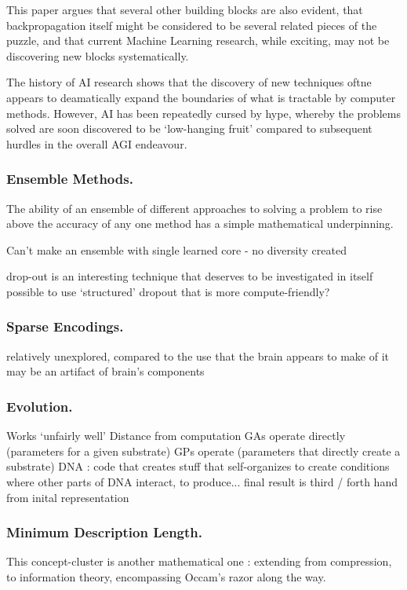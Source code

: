 \documentclass[citeauthoryear]{llncs}
\begin{document}
This paper argues that several other building blocks are also evident, 
that backpropagation itself might be considered to be several related pieces of the puzzle,
and that current Machine Learning research, while exciting, may not be
discovering new blocks systematically.

The history of AI research shows that the discovery of new techniques 
oftne appears to deamatically expand the boundaries of what is 
tractable by computer methods.  
However, AI has been repeatedly cursed by hype, whereby the problems 
solved are soon discovered to be `low-hanging fruit' compared to subsequent 
hurdles in the overall AGI endeavour.



\subsubsection*{Ensemble Methods.}
The ability of an ensemble of different approaches to solving a problem to rise above the accuracy 
of any one method has a simple mathematical underpinning.  

Can't make an ensemble with single learned core - no diversity created

drop-out is an interesting technique that deserves to be investigated in itself
  possible to use `structured' dropout that is more compute-friendly?


\subsubsection*{Sparse Encodings.}
  relatively unexplored, compared to the use that the brain appears to make of it
    may be an artifact of brain's components
    
\subsubsection*{Evolution.}
  Works `unfairly well'
  Distance from computation
    GAs operate directly (parameters for a given substrate)
    GPs operate (parameters that directly create a substrate)
    DNA : code that creates stuff that self-organizes to create conditions where 
      other parts of DNA interact, to produce...   
        final result is third / forth hand from inital representation

\subsubsection*{Minimum Description Length.}
This concept-cluster is another mathematical one : extending from compression, to information theory,
encompassing Occam's razor along the way.
\end{document}
